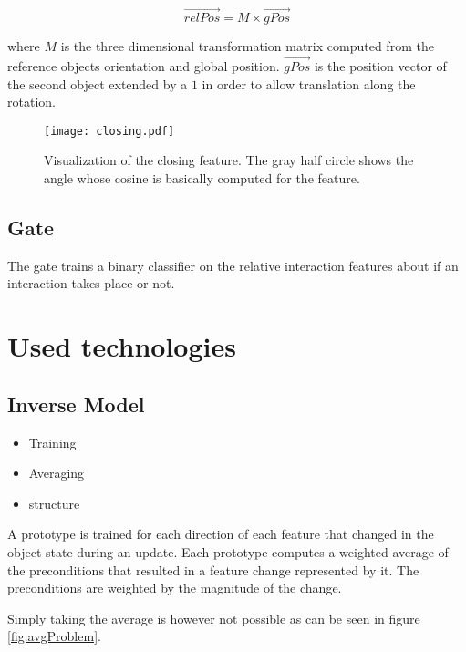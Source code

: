 \begin{equation}
	\vec{relPos} = M \times \vec{gPos}
\label{eq:trans}
\end{equation}

where $M$ is the three dimensional transformation matrix computed from the reference objects orientation and global position. $\vec{gPos}$ is the position vector of the second object extended by a $1$ in order to allow translation along the rotation. 

\begin{figure}
	\centering
	\texttt{[image: closing.pdf]}
	\caption{Visualization of the closing feature. The gray half circle shows the angle whose cosine is basically computed for the feature.} 
	\label{fig:closing}
\end{figure}

\subsection{Gate}

The gate trains a binary classifier on the relative interaction features about if an interaction takes place or not. 



\section{Used technologies \label{sec:technologies}}

\subsection{Inverse Model \label{sec:invModelRealization}} %

\begin{itemize}
\item Training
\item Averaging
\item structure
\end{itemize}


A prototype is trained for each direction of each feature that changed in the object state during an update. Each prototype computes a weighted average of the preconditions that resulted in a feature change represented by it. The preconditions are weighted by the magnitude of the change. 

Simply taking the average is however not possible as can be seen in figure \ref{fig:avgProblem}.

